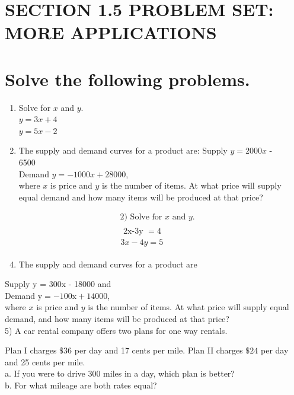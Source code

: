 \section*{SECTION 1.5 PROBLEM SET: MORE APPLICATIONS}
\section*{Solve the following problems.}
\begin{enumerate}
  \item Solve for $x$ and $y$.\\
$y=3 x+4$\\
$y=5 x-2$
  \item The supply and demand curves for a product are: Supply $y=2000 x$ -\\
6500\\
Demand $y=-1000 x+28000$,\\
where $x$ is price and $y$ is the number of items. At what price will supply\\
equal demand and how many items will be produced at that price?
\end{enumerate}

$$
\begin{aligned}
& \text { 2) Solve for } x \text { and } y \text {. } \\
& \begin{array}{l}
\text { 2x-3y }=4 \\
3 x-4 y=5
\end{array}
\end{aligned}
$$

\begin{enumerate}
  \setcounter{enumi}{3}
  \item The supply and demand curves for a product are
\end{enumerate}

Supply y = 300x - 18000 and\\
Demand $\mathrm{y}=-100 \mathrm{x}+14000$,\\
where $x$ is price and $y$ is the number of items. At what price will supply equal demand, and how many items will be produced at that price?\\
5) A car rental company offers two plans for one way rentals.

Plan I charges $\$ 36$ per day and 17 cents per mile. Plan II charges $\$ 24$ per day and 25 cents per mile.\\
a. If you were to drive 300 miles in a day, which plan is better?\\
b. For what mileage are both rates equal?

